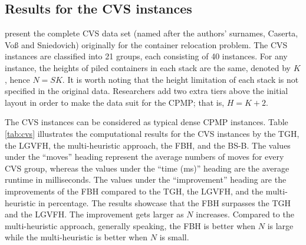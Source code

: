 \documentclass[review,3p,times,12pt,number]{elsarticle}\usepackage{amsmath}\usepackage{amssymb}
\renewcommand{\citet}[1]{\citeauthor{#1} \citep{#1}}
\begin{document}
\subsection{Results for the CVS instances}

\citet{cas2011} present the complete CVS data set (named after the authors' surnames, Caserta, Vo{\ss} and Sniedovich) originally for the container relocation problem. The CVS instances are classified into 21 groups, each consisting of 40 instances.
For any instance, the heights of piled containers in each stack are the same, denoted by $K$, hence $N=SK$. It is worth noting that the height limitation of each stack is not specified in the original data.
Researchers add two extra tiers above the initial layout in order to make the data suit for the CPMP; that is, $H=K+2$.

The CVS instances can be considered as typical dense CPMP instances.
Table \ref{tab:cvs} illustrates the computational results for the CVS instances by the TGH, the LGVFH, the multi-heuristic approach, the FBH, and the BS-B\@.
The values under the ``moves'' heading represent the average numbers of moves for every CVS group, whereas the values under the ``time (ms)'' heading are the average runtime in milliseconds.
The values under the ``improvement'' heading are the improvements of the FBH compared to the TGH, the LGVFH, and the multi-heuristic in percentage.
The results showcase that the FBH surpasses the TGH and the LGVFH. The improvement gets larger as $N$ increases. Compared to the multi-heuristic approach, generally speaking, the FBH is better when $N$ is large while the multi-heuristic is better when $N$ is small.
\end{document}
